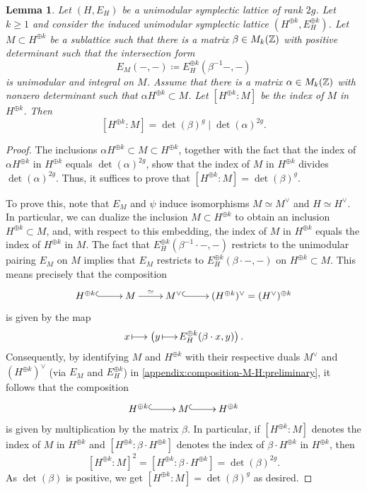 \documentclass[a4paper,11pt,reqno]{amsart}
\makeatletter
\numberwithin{equation}{section}
\theoremstyle{plain}
\newtheorem{lemma}[theorem]{Lemma}
\theoremstyle{definition}
\newcommand{\Z}{\mathbb Z}
\let\rm\relax
\newcommand{\rm}[1]{{\mathrm{#1}}}
\renewcommand{\mapsto}{\xymatrix@1@=15pt{\ar@{|->}[r]&}}
\renewcommand{\cong}{\simeq}
\makeatother
\begin{document}
\begin{lemma} \label{lemma:appendix:preliminary-lemma}
Let $(H,E_H)$ be a unimodular symplectic lattice of rank $2g$. 
Let $k\geq 1$ and consider the induced unimodular symplectic lattice $(H^{\oplus k},E_{H}^{\oplus k})$. 
Let $M\subset H^{\oplus k}$ be a sublattice such that there is a matrix $\beta\in \rm{M}_k(\Z)$ with positive determinant such that the intersection form $$
E_M(-,-)\coloneqq E_H^{\oplus k}(\beta^{-1}-,-)
$$ 
is unimodular and integral on $M$. Assume that there is a matrix $\alpha\in \rm{M}_k(\Z)$ with nonzero determinant such that $\alpha H^{\oplus k}\subset M$. Let $[H^{\oplus k} \colon M]$ be the index of $M$ in $H^{\oplus k}$. Then 
\[
\left[H^{\oplus k} \colon M \right] = \det(\beta)^g  
 \mid \det(\alpha)^{2g}. 
\]
\end{lemma}
\begin{proof}
The inclusions $\alpha H^{\oplus k} \subset M \subset H^{\oplus k}$, together with the fact that the index of $\alpha H^{\oplus k}$ in $H^{\oplus k}$ equals $\det(\alpha)^{2g}$, show that the index of $M$ in $H^{\oplus k}$ divides $\det(\alpha)^{2g}$. Thus, it suffices to prove that $[H^{\oplus k} \colon M] = \det(\beta)^g$. 

To prove this, note that $E_M$ and $\psi$ induce isomorphisms $M \cong M^\vee$ and $H \cong H^\vee$. In particular, we can dualize the inclusion $M \subset H^{\oplus k}$ to obtain an inclusion $H^{\oplus k} \subset M$, and, with respect to this embedding, the index of $M$ in $H^{\oplus k}$ equals the index of $H^{\oplus k}$ in $M$. 
The fact that $E_H^{\oplus k}(\beta^{-1}\cdot  -, -)$ restricts to the unimodular pairing $E_M$ on $M$ implies that $E_M$ restricts to $E_H^{\oplus k}(\beta \cdot -, -)$ on $H^{\oplus k} \subset M$. This means precisely that the composition
\begin{align}\label{appendix:composition-M-H:preliminary}
\xymatrix{
H^{\oplus k} \ar@{^{(}->}[r] & M \ar[r]^-{\cong} & M^\vee \ar@{^{(}->}[r] & (H^{\oplus k})^\vee = (H^\vee)^{\oplus k} 
}
\end{align}
is given by the map
\[
x \mapsto \left(y \mapsto E_H^{\oplus k}(\beta \cdot x, y) \right). 
\]
Consequently, by identifying $M$ and $H^{\oplus k}$ with their respective duals $M^\vee$ and $(H^{\oplus k})^\vee$ (via $E_M$ and $E_H^{\oplus k}$) in \eqref{appendix:composition-M-H:preliminary}, it follows that the composition
\[
\xymatrix{
H^{\oplus k} \ar@{^{(}->}[r] & M \ar@{^{(}->}[r] & H^{\oplus k}
}
\]
is given by multiplication by the matrix $\beta$. In particular, if $[H^{\oplus k} \colon M]$ denotes the index of $M$ in $H^{\oplus k}$ and $[ H^{\oplus k} \colon \beta \cdot H^{\oplus k}]$ denotes the index of $\beta \cdot H^{\oplus k}$ in $H^{\oplus k}$, then
\[
\left[ H^{\oplus k} \colon M \right]^2= \left[ H^{\oplus k} \colon \beta \cdot H^{\oplus k}\right] = \det(\beta)^{2g}.
\]
As $\det(\beta)$ is positive, we get $[H^{\oplus k} \colon M] = \det(\beta)^g$ as desired. 
\end{proof}
 
\end{document}
